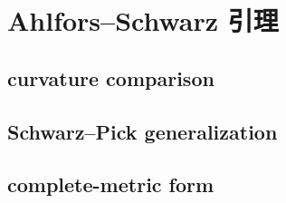 \section{Ahlfors–Schwarz 引理}
\label{b3:sec:1402}


\subsection{curvature comparison}
\label{b3:subsec:140201}

\subsection{Schwarz–Pick generalization}
\label{b3:subsec:140202}

\subsection{complete-metric form}
\label{b3:subsec:140203}


